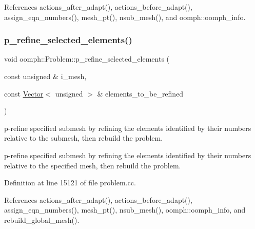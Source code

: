 References actions\+\_\+after\+\_\+adapt(), actions\+\_\+before\+\_\+adapt(), assign\+\_\+eqn\+\_\+numbers(), mesh\+\_\+pt(), nsub\+\_\+mesh(), and oomph\+::oomph\+\_\+info.

\mbox{\label{classoomph_1_1Problem_a86f7b013945049548f86377e489e23f1}} 
\subsubsection{\texorpdfstring{p\+\_\+refine\+\_\+selected\+\_\+elements()}{p\_refine\_selected\_elements()}\hspace{0.1cm}{\footnotesize\ttfamily [3/6]}}
{\footnotesize\ttfamily void oomph\+::\+Problem\+::p\+\_\+refine\+\_\+selected\+\_\+elements (\begin{DoxyParamCaption}\item[{const unsigned \&}]{i\+\_\+mesh,  }\item[{const \hyperlink{classoomph_1_1Vector}{Vector}$<$ unsigned $>$ \&}]{elements\+\_\+to\+\_\+be\+\_\+refined }\end{DoxyParamCaption})}



p-\/refine specified submesh by refining the elements identified by their numbers relative to the submesh, then rebuild the problem. 

p-\/refine specified submesh by refining the elements identified by their numbers relative to the specified mesh, then rebuild the problem. 

Definition at line 15121 of file problem.\+cc.



References actions\+\_\+after\+\_\+adapt(), actions\+\_\+before\+\_\+adapt(), assign\+\_\+eqn\+\_\+numbers(), mesh\+\_\+pt(), nsub\+\_\+mesh(), oomph\+::oomph\+\_\+info, and rebuild\+\_\+global\+\_\+mesh().

\mbox{\label{classoomph_1_1Problem_a2c8c730acabb7f203b8e0d39af8b017b}} 
